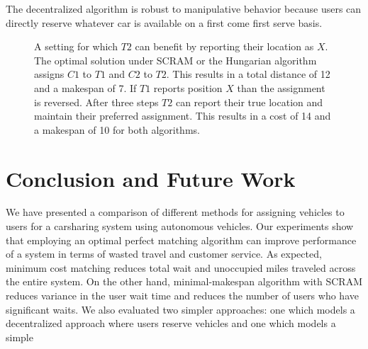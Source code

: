 \documentclass[letterpaper]{article}
\begin{document}
The decentralized algorithm is robust to manipulative behavior because users can directly reserve whatever car is available on a first come first serve basis. 

\begin{figure}

\begin{subfigure}[t]{0.2\textwidth}
\centering
{}
\end{subfigure}

\vspace{10pt}
\begin{subfigure}[t]{0.2\textwidth}
\centering
{}
\end{subfigure}
\caption{A setting for which $T2$ can benefit by reporting their location as $X$. The optimal solution under SCRAM or the Hungarian algorithm assigns $C1$ to $T1$ and $C2$ to $T2$. This results in a total distance of 12 and a makespan of 7. If $T1$ reports position $X$ than the assignment is reversed. After three steps $T2$ can report their true location and maintain their preferred assignment. This results in a cost of 14 and a makespan of 10 for both algorithms.}
\label{fig:falsereport}
\end{figure}

\section{Conclusion and Future Work}

We have presented a comparison of different methods for assigning vehicles to users for a carsharing system using autonomous vehicles. Our experiments show that employing an optimal perfect matching algorithm can improve performance of a system in terms of wasted travel and customer service. As expected, minimum cost matching reduces total wait and unoccupied miles traveled across the entire system. On the other hand, minimal-makespan algorithm with SCRAM reduces variance in the user wait time and reduces the number of users who have significant waits. We also evaluated two simpler approaches: one which models a decentralized approach where users reserve vehicles and one which models a simple
\end{document}

